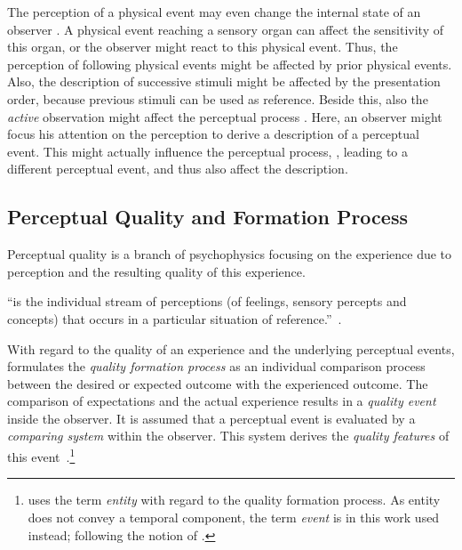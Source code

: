 The perception of a physical event may even change the internal state of an observer \citep{raake_quality_2014}.
A physical event reaching a sensory organ can affect the sensitivity of this organ, or the observer might react to this physical event.
Thus, the perception of following physical events might be affected by prior physical events.
Also, the description of successive stimuli might be affected by the presentation order, because previous stimuli can be used as reference.
Beside this, also the \emph{active} observation might affect the perceptual process \citep[][p.\,30]{raake_quality_2014}.
Here, an observer might focus his attention on the perception to derive a description of a perceptual event.
This might actually influence the perceptual process, \ie, leading to a different perceptual event, and thus also affect the description.


\subsection{Perceptual Quality and Formation Process}\label{related:perceivedQuality}
Perceptual quality is a branch of psychophysics focusing on the experience due to perception and the resulting quality of this experience.
\begin{definition}[Experiencing]
``is the individual stream of perceptions (of feelings, sensory percepts and concepts) that occurs in a particular situation of reference.''~\citep[p.\,13]{raake_quality_2014}.
\end{definition}

With regard to the quality of an experience and the underlying perceptual events, \citet{jekosch_voice_2005} formulates the \emph{quality formation process} as an individual comparison process between the desired or expected outcome with the experienced outcome.
The comparison of expectations and the actual experience results in a \emph{quality event} inside the observer.
It is assumed that a perceptual event is evaluated by a \emph{comparing system} within the observer.
This system  derives the \emph{quality features} of this event~\citep[\cf,][p.\,17]{jekosch_voice_2005}.\footnote{\citet{jekosch_voice_2005} uses the term \emph{entity} with regard to the quality formation process.
As entity does not convey a temporal component, the term \emph{event} is in this work used instead; following the notion of \citet{blauert_spatial_1996}.}

